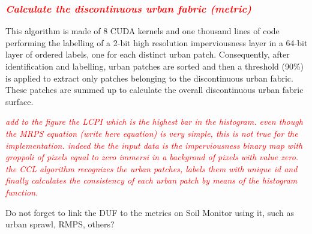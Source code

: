 \documentclass[APA,LATO1COL,doublespace]{WileyNJD-v2}
\newcommand{\toberevised}[1]{\emph{\textcolor{red}{#1}}} %
\begin{document}
\subsubsection{ \toberevised{Calculate the discontinuous urban fabric (metric)} }
\label{sec:mmDUF}
This algorithm is made of 8 CUDA kernels and one thousand lines of code performing the labelling of a 2-bit high resolution imperviousness layer in a 64-bit layer of ordered labels, one for each distinct urban patch.
Consequently, after identification and labelling, urban patches are sorted and then a threshold (90\%) is applied to extract only patches belonging to the discontinuous urban fabric. 
These patches are summed up to calculate the overall discontinuous urban fabric surface.


\toberevised{add to the figure the LCPI which is the highest bar in the histogram.
even though the MRPS equation (write here equation) is very simple, this is not true for the implementation.
indeed the the input data is the imperviousness binary map with groppoli of pixels equal to zero immersi in a backgroud of pixels with value zero. the CCL algorithm recognizes the urban patches, labels them with unique id and finally calculates the consistency of each urban patch by means of the histogram function.      }

Do not forget to link the DUF to the metrics on Soil Monitor using it, such as urban sprawl, RMPS, others?
\end{document}
